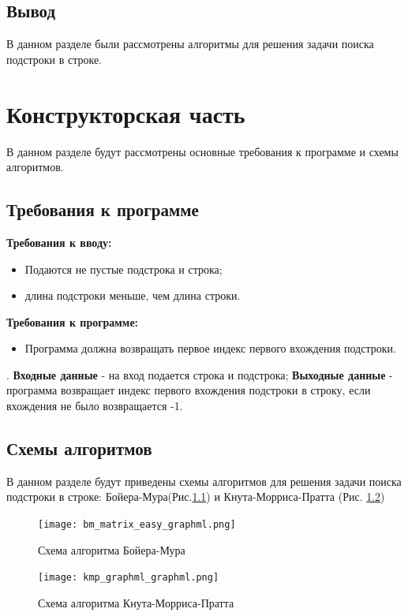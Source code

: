 \documentclass[12pt]{report}
\begin{document}
\section*{Вывод}
В данном разделе были рассмотрены алгоритмы для решения задачи поиска подстроки в строке. 


\chapter{Конструкторская часть}
В данном разделе будут рассмотрены основные требования к программе и схемы алгоритмов.

\section{Требования к программе}
\textbf{Требования к вводу:}
\begin{itemize}
	\item Подаются не пустые подстрока и строка;
	\item длина подстроки меньше, чем длина строки.
\end{itemize}

\textbf{Требования к программе:}
\begin{itemize}
	\item Программа должна возвращать первое индекс первого вхождения подстроки.
\end{itemize}
.  
\newline  
\textbf{Входные данные} - на вход подается строка и подстрока;
\newline
\textbf{Выходные данные} - программа возвращает индекс первого вхождения подстроки в строку, если вхождения не было возвращается -1.

\section{Схемы алгоритмов}
В данном разделе будут приведены схемы алгоритмов для решения задачи поиска подстроки в строке:
Бойера-Мура(Рис.\ref{fig:BM}) и Кнута-Морриса-Пратта (Рис. \ref{fig:KMP})\\
\begin{figure}[!htbp]
	\centering
	\texttt{[image: bm\_matrix\_easy\_graphml.png]}
	\caption{Схема алгоритма Бойера-Мура}
	\label{fig:BM}
\end{figure}
\begin{figure}[!htbp]
	\centering
	\texttt{[image: kmp\_graphml\_graphml.png]}
	\caption{Схема алгоритма Кнута-Морриса-Пратта}
	\label{fig:KMP}
\end{figure}
\end{document}
